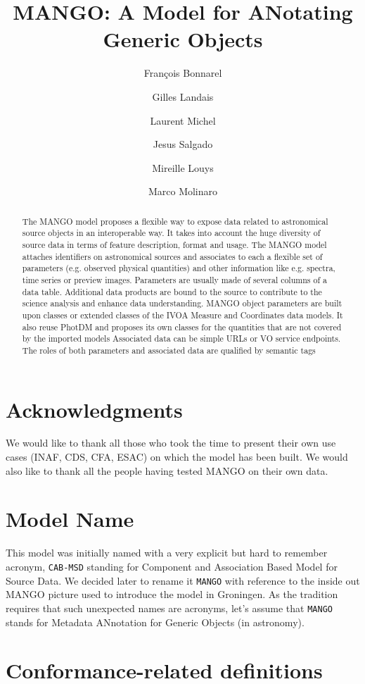 \documentclass[11pt,a4paper]{ivoa}
\title{MANGO: A Model for ANotating Generic Objects}
\author{François Bonnarel}
\author{Gilles Landais}
\author{Laurent Michel}
\author{Jesus Salgado}
\author{Mireille Louys}
\author{Marco Molinaro}
\begin{document}
\begin{abstract}
The MANGO model proposes a flexible way to expose data related to astronomical source objects 
in an interoperable way.
It takes into account the huge diversity of source data in terms of feature description, format and usage.
The MANGO model attaches identifiers on astronomical sources and associates to each a flexible 
set of parameters (e.g. observed physical quantities) and other information like e.g. spectra,
time series or preview images.
Parameters are usually made of several columns of a data table.
Additional data products are bound to the source to contribute to the science analysis
and enhance data understanding.
MANGO object parameters are built upon classes or extended classes of the IVOA Measure
and Coordinates data models. It also reuse PhotDM and proposes its own classes for the quantities 
that are not covered by the imported models
Associated data can be simple URLs or VO service endpoints.
The roles of both parameters and associated data are qualified by semantic tags

\end{abstract}


\section*{Acknowledgments}

We would like to thank all those who took the time to present their own use cases (INAF, CDS, CFA, ESAC) on which the model has been built.
We would also like to thank all the people having tested MANGO on their own data.

\section*{Model Name}
This model was initially named with a very explicit but hard to remember acronym, \texttt{CAB-MSD}
standing for Component and Association Based Model for Source Data.
We decided later to rename it \texttt{MANGO} with reference to the inside out MANGO
picture used to introduce the model in Groningen. 
As the tradition requires that such unexpected names are acronyms,
let's assume that \texttt{MANGO} stands for
Metadata ANnotation for Generic Objects (in astronomy).


\section*{Conformance-related definitions}
\end{document}

